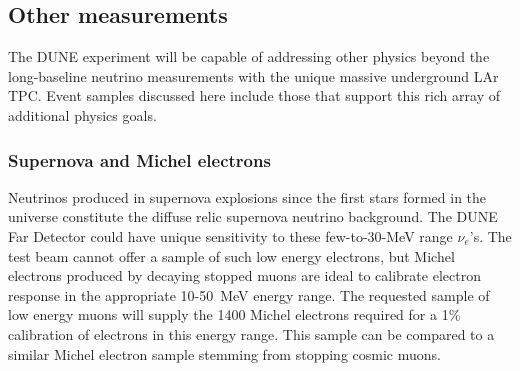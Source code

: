 





\subsection{Other measurements} 
\label{sec_other}

The DUNE experiment will be capable of addressing other physics beyond the long-baseline neutrino measurements with the unique massive underground LAr TPC. Event samples discussed here include those that support this rich array of additional physics goals.


\subsubsection{Supernova and Michel electrons}

Neutrinos produced in supernova explosions since the first stars formed in the universe constitute the
diffuse relic supernova neutrino background. The DUNE Far Detector could have unique sensitivity to these
few-to-30-MeV range $\nu_e$'s. 
The test beam cannot offer a sample of  such low energy electrons, but Michel electrons  produced by 
decaying stopped muons are ideal to calibrate electron response in the appropriate 10-50~MeV energy range. 
The requested sample of low energy muons will supply the 1400 Michel electrons required for a 1\% 
calibration of electrons in this energy range. This sample can be compared to a similar Michel electron sample
stemming from stopping cosmic muons.


